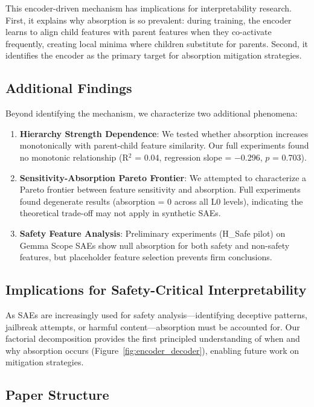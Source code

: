\documentclass{article}
\begin{document}
This encoder-driven mechanism has implications for interpretability research. First, it explains why absorption is so prevalent: during training, the encoder learns to align child features with parent features when they co-activate frequently, creating local minima where children substitute for parents. Second, it identifies the encoder as the primary target for absorption mitigation strategies.

\subsection{Additional Findings}

Beyond identifying the mechanism, we characterize two additional phenomena:

\begin{enumerate}
\item \textbf{Hierarchy Strength Dependence}: We tested whether absorption increases monotonically with parent-child feature similarity. Our full experiments found no monotonic relationship (R$^2$ = 0.04, regression slope = $-$0.296, $p$ = 0.703).

\item \textbf{Sensitivity-Absorption Pareto Frontier}: We attempted to characterize a Pareto frontier between feature sensitivity and absorption. Full experiments found degenerate results (absorption = 0 across all L0 levels), indicating the theoretical trade-off may not apply in synthetic SAEs.

\item \textbf{Safety Feature Analysis}: Preliminary experiments (H\_Safe pilot) on Gemma Scope SAEs show null absorption for both safety and non-safety features, but placeholder feature selection prevents firm conclusions.
\end{enumerate}

\subsection{Implications for Safety-Critical Interpretability}

As SAEs are increasingly used for safety analysis---identifying deceptive patterns, jailbreak attempts, or harmful content---absorption must be accounted for. Our factorial decomposition provides the first principled understanding of when and why absorption occurs (Figure~\ref{fig:encoder_decoder}), enabling future work on mitigation strategies.

\subsection{Paper Structure}
\end{document}
